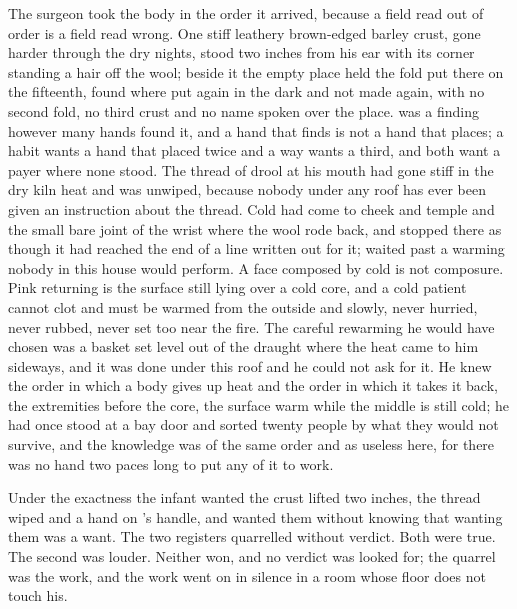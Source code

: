 The surgeon took the body in the order it arrived, because a field read out of order is a field read wrong. One stiff leathery brown-edged barley crust, gone harder through the dry nights, stood two inches from his ear with its corner standing a hair off the wool; beside it the empty place held the fold put there on the fifteenth, found where put again in the dark and not made again, with no second fold, no third crust and no name spoken over the place.  was a finding however many hands found it, and a hand that finds is not a hand that places; a habit wants a hand that placed twice and a way wants a third, and both want a payer where none stood. The thread of drool at his mouth had gone stiff in the dry kiln heat and was unwiped, because nobody under any roof has ever been given an instruction about the thread. Cold had come to cheek and temple and the small bare joint of the wrist where the wool rode back, and stopped there as though it had reached the end of a line written out for it;  waited past a warming nobody in this house would perform. A face composed by cold is not composure. Pink returning is the surface still lying over a cold core, and a cold patient cannot clot and must be warmed from the outside and slowly, never hurried, never rubbed, never set too near the fire. The careful rewarming he would have chosen was a basket set level out of the draught where the heat came to him sideways, and it was done under this roof and he could not ask for it. He knew the order in which a body gives up heat and the order in which it takes it back, the extremities before the core, the surface warm while the middle is still cold; he had once stood at a bay door and sorted twenty people by what they would not survive, and the knowledge was of the same order and as useless here, for there was no hand two paces long to put any of it to work.

Under the exactness the infant wanted the crust lifted two inches, the thread wiped and a hand on 's handle, and wanted them without knowing that wanting them was a want. The two registers quarrelled without verdict. Both were true. The second was louder. Neither won, and no verdict was looked for; the quarrel was the work, and the work went on in silence in a room whose floor does not touch his.

